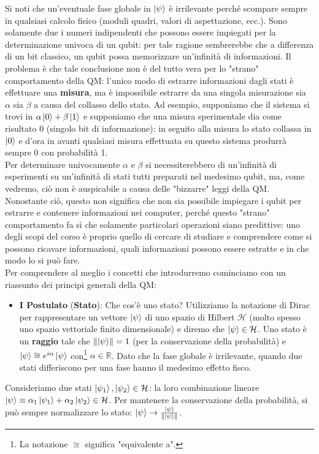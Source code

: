 \noindent Si noti che un'eventuale fase globale in $\ket{\psi}$ è irrilevante perché scompare sempre in qualsiasi calcolo fisico (moduli quadri, valori di aspettazione, ecc.). Sono solamente due i numeri indipendenti che possono essere impiegati per la determinazione univoca di un qubit: per tale ragione sembrerebbe che a differenza di un bit classico, un qubit possa memorizzare un'infinità di informazioni. Il problema è che tale conclusione non è del tutto vera per lo "strano" comportamento della QM: l'unico modo di estrarre informazioni dagli stati è effettuare una \textbf{misura}, ma è impossibile estrarre da una singola misurazione sia $\alpha$ sia $\beta$ a causa del collasso dello stato. Ad esempio, supponiamo che il sistema si trovi in $\alpha \ket{0} + \beta \ket{1}$ e supponiamo che una misura sperimentale dia come risultato 0 (singolo bit di informazione): in seguito alla misura lo stato collassa in $\ket{0}$ e d'ora in avanti qualsiasi misura effettuata su questo sistema produrrà sempre $0$ con probabilità 1. \\
\noindent Per determinare univocamente $\alpha$ e $\beta$ si necessiterebbero di un'infinità di esperimenti su un'infinità di stati tutti preparati nel medesimo qubit, ma, come vedremo, ciò non è auspicabile a causa delle "bizzarre" leggi della QM. Nonostante ciò, questo non significa che non sia possibile impiegare i qubit per estrarre e contenere informazioni nei computer, perché questo "strano" comportamento fa sì che solamente particolari operazioni siano predittive: uno degli scopi del corso è proprio quello di cercare di studiare e comprendere come si possono ricavare informazioni, quali informazioni possono essere estratte e in che modo lo si può fare. \\
\noindent Per comprendere al meglio i concetti che introdurremo cominciamo con un riassunto dei principi generali della QM:
\begin{itemize}
    \item \textbf{I Postulato} (\textbf{Stato}): Che cos'è uno stato? Utilizziamo la notazione di Dirac per rappresentare un vettore $\ket{\psi}$ di uno spazio di Hilbert $\mathcal{H}$ (molto spesso uno spazio vettoriale finito dimensionale) e diremo che $\ket{\psi} \in \mathcal{H}$. Uno stato è un \textbf{raggio} tale che $\norm{\ket{\psi}} = 1$ (per la conservazione della probabilità) e $\ket{\psi} \cong e^{i \alpha} \ket{\psi}$ con\footnote{La notazione $\cong$ significa "equivalente a".} $\alpha \in \mathbb{R}$. Dato che la fase globale è irrilevante, quando due stati differiscono per una fase hanno il medesimo effetto fisco. 
\end{itemize}
Consideriamo due stati $\ket{\psi_1}, \ket{\psi_2} \in \mathcal{H}$: la loro combinazione lineare $\ket{\psi} \equiv \alpha_1 \ket{\psi_1} + \alpha_2 \ket{\psi_2} \in \mathcal{H}$. Per mantenere la conservazione della probabilità, si può sempre normalizzare lo stato: $\ket{\psi} \to \frac{\ket{\psi}}{\norm{\ket{\psi}}}$. 

